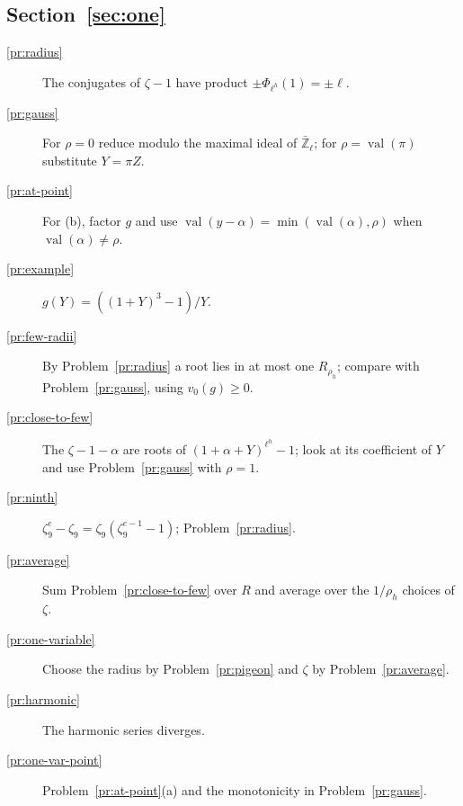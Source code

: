 \documentclass[reqno]{amsart}
\theoremstyle{definition}
\theoremstyle{plain}
\newcommand{\Zl}{\bar{\mathbb{Z}}_\ell}
\newcommand{\val}{\operatorname{val}}
\begin{document}
\subsection*{Section~\ref{sec:one}}
\begin{description}
\item[\ref{pr:radius}] The conjugates of \(\zeta - 1\) have product \(\pm\Phi_{\ell^h}(1) = \pm\ell\).
\item[\ref{pr:gauss}] For \(\rho = 0\) reduce modulo the maximal ideal of \(\Zl\); for \(\rho = \val(\pi)\) substitute \(Y = \pi Z\).
\item[\ref{pr:at-point}] For (b), factor \(g\) and use \(\val(y - \alpha) = \min(\val(\alpha), \rho)\) when \(\val(\alpha) \ne \rho\).
\item[\ref{pr:example}] \(g(Y) = ((1 + Y)^3 - 1)/Y\).
\item[\ref{pr:few-radii}] By Problem~\ref{pr:radius} a root lies in at most one \(R_{\rho_h}\); compare with Problem~\ref{pr:gauss}, using \(v_0(g) \ge 0\).
\item[\ref{pr:close-to-few}] The \(\zeta - 1 - \alpha\) are roots of \((1 + \alpha + Y)^{\ell^h} - 1\); look at its coefficient of \(Y\) and use Problem~\ref{pr:gauss} with \(\rho = 1\).
\item[\ref{pr:ninth}] \(\zeta_9^e - \zeta_9 = \zeta_9(\zeta_9^{e-1} - 1)\); Problem~\ref{pr:radius}.
\item[\ref{pr:average}] Sum Problem~\ref{pr:close-to-few} over \(R\) and average over the \(1/\rho_h\) choices of \(\zeta\).
\item[\ref{pr:one-variable}] Choose the radius by Problem~\ref{pr:pigeon} and \(\zeta\) by Problem~\ref{pr:average}.
\item[\ref{pr:harmonic}] The harmonic series diverges.
\item[\ref{pr:one-var-point}] Problem~\ref{pr:at-point}(a) and the monotonicity in Problem~\ref{pr:gauss}.
\end{description}
\end{document}
